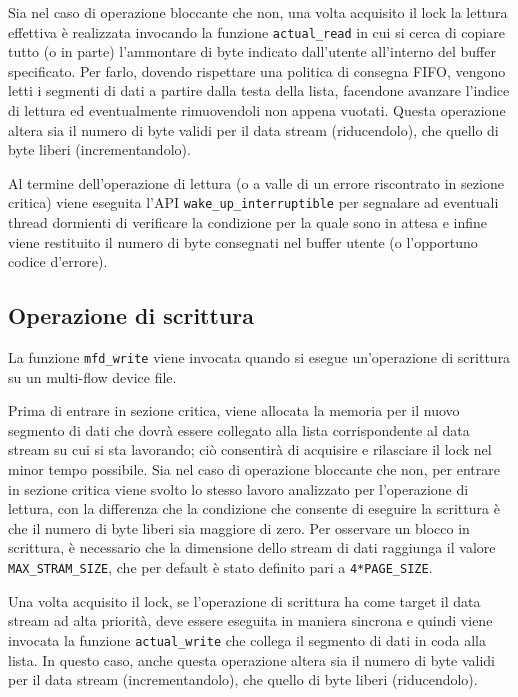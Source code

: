 \documentclass{article}
\begin{document}
Sia nel caso di operazione bloccante che non, una volta acquisito il lock la lettura effettiva è realizzata invocando la funzione \texttt{actual\_read} in cui si cerca di copiare tutto (o in parte) l'ammontare di byte indicato dall'utente all'interno del buffer specificato. Per farlo, dovendo rispettare una politica di consegna FIFO, vengono letti i segmenti di dati a partire dalla testa della lista, facendone avanzare l'indice di lettura ed eventualmente rimuovendoli non appena vuotati. Questa operazione altera sia il numero di byte validi per il data stream (riducendolo), che quello di byte liberi (incrementandolo).

Al termine dell'operazione di lettura (o a valle di un errore riscontrato in sezione critica) viene eseguita l'API \texttt{wake\_up\_interruptible} per segnalare ad eventuali thread dormienti di verificare la condizione per la quale sono in attesa e infine viene restituito il numero di byte consegnati nel buffer utente (o l'opportuno codice d'errore).

\subsection{Operazione di scrittura}
La funzione \texttt{mfd\_write} viene invocata quando si esegue un'operazione di scrittura su un multi-flow device file.

Prima di entrare in sezione critica, viene allocata la memoria per il nuovo segmento di dati che dovrà essere collegato alla lista corrispondente al data stream su cui si sta lavorando; ciò consentirà di acquisire e rilasciare il lock nel minor tempo possibile. Sia nel caso di operazione bloccante che non, per entrare in sezione critica viene svolto lo stesso lavoro analizzato per l'operazione di lettura, con la differenza che la condizione che consente di eseguire la scrittura è che il numero di byte liberi sia maggiore di zero. Per osservare un blocco in scrittura, è necessario che la dimensione dello stream di dati raggiunga il valore \texttt{MAX\_STRAM\_SIZE}, che per default è stato definito pari a \texttt{4*PAGE\_SIZE}.

Una volta acquisito il lock, se l'operazione di scrittura ha come target il data stream ad alta priorità, deve essere eseguita in maniera sincrona e quindi viene invocata la funzione \texttt{actual\_write} che collega il segmento di dati in coda alla lista. In questo caso, anche questa operazione altera sia il numero di byte validi per il data stream (incrementandolo), che quello di byte liberi (riducendolo).
\end{document}
